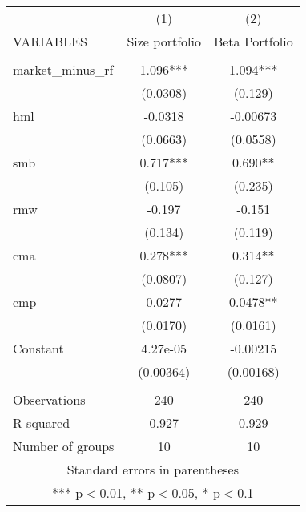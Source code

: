 \begin{tabular}{lcc} \hline
 & (1) & (2) \\
VARIABLES & Size portfolio & Beta Portfolio \\ \hline
 &  &  \\
market\_minus\_rf & 1.096*** & 1.094*** \\
 & (0.0308) & (0.129) \\
hml & -0.0318 & -0.00673 \\
 & (0.0663) & (0.0558) \\
smb & 0.717*** & 0.690** \\
 & (0.105) & (0.235) \\
rmw & -0.197 & -0.151 \\
 & (0.134) & (0.119) \\
cma & 0.278*** & 0.314** \\
 & (0.0807) & (0.127) \\
emp & 0.0277 & 0.0478** \\
 & (0.0170) & (0.0161) \\
Constant & 4.27e-05 & -0.00215 \\
 & (0.00364) & (0.00168) \\
 &  &  \\
Observations & 240 & 240 \\
R-squared & 0.927 & 0.929 \\
 Number of groups & 10 & 10 \\ \hline
\multicolumn{3}{c}{ Standard errors in parentheses} \\
\multicolumn{3}{c}{ *** p$<$0.01, ** p$<$0.05, * p$<$0.1} \\
\end{tabular}
